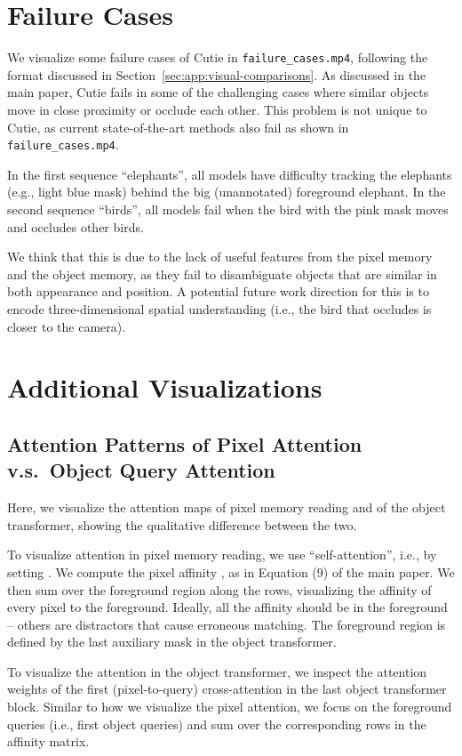 \section{Failure Cases}\label{sec:app:failure-cases}
We visualize some failure cases of Cutie in {\tt failure\_cases.mp4}, following the format discussed in Section~\ref{sec:app:visual-comparisons}.
As discussed in the main paper, Cutie fails in some of the challenging cases where similar objects move in close proximity or occlude each other. 
This problem is not unique to Cutie, as current state-of-the-art methods also fail as shown in {\tt failure\_cases.mp4}.

In the first sequence ``elephants'', all models have difficulty tracking the elephants (e.g., light blue mask) behind the big (unannotated) foreground elephant.
In the second sequence ``birds'', all models fail when the bird with the pink mask moves and occludes other birds.

We think that this is due to the lack of useful features from the pixel memory and the object memory, as they fail to disambiguate objects that are similar in both appearance and position.
A potential future work direction for this is to encode three-dimensional spatial understanding (i.e., the bird that occludes is closer to the camera).

\section{Additional Visualizations}\label{sec:app:visualizations}
\subsection{Attention Patterns of Pixel Attention v.s.\ Object Query Attention}
Here, we visualize the attention maps of pixel memory reading and of the object transformer, showing the qualitative difference between the two.

To visualize attention in pixel memory reading, we use ``self-attention'', i.e., by setting .
We compute the pixel affinity , as in Equation (9) of the main paper.
We then sum over the foreground region along the rows, visualizing the affinity of every pixel to the foreground. Ideally, all the affinity should be in the foreground -- others are distractors that cause erroneous matching. The foreground region is defined by the last auxiliary mask  in the object transformer.

To visualize the attention in the object transformer, we inspect the attention weights  of the first (pixel-to-query) cross-attention in the last object transformer block.
Similar to how we visualize the pixel attention, we focus on the foreground queries (i.e., first  object queries) and sum over the corresponding rows in the affinity matrix.

